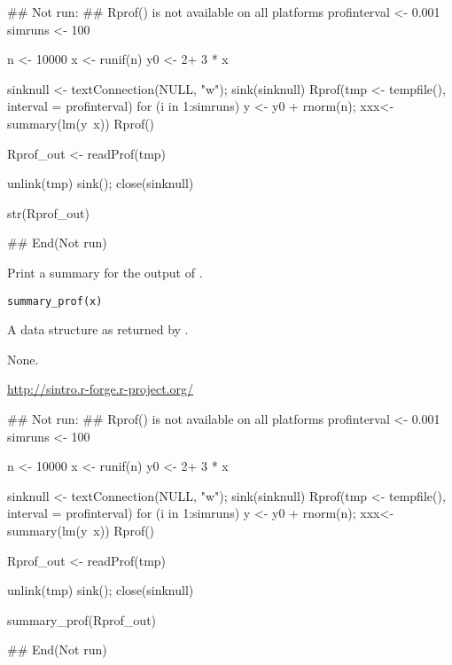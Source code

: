 \documentclass[a4paper]{book}
\begin{document}
%
\begin{Examples}
\begin{ExampleCode}
## Not run: 
## Rprof() is not available on all platforms
profinterval <- 0.001
simruns <- 100

n <- 10000
x <- runif(n)
y0 <- 2+ 3 * x

sinknull <- textConnection(NULL, "w"); sink(sinknull)
Rprof(tmp <- tempfile(), interval = profinterval)
for (i in 1:simruns) {y <- y0 +  rnorm(n); xxx<- summary(lm(y~x))}
Rprof()

Rprof_out <- readProf(tmp)

unlink(tmp)
sink(); close(sinknull)

str(Rprof_out)

## End(Not run)
\end{ExampleCode}
\end{Examples}
%
\begin{Description}\relax
Print a summary for the output of .
\end{Description}
%
\begin{Usage}
\begin{verbatim}
summary_prof(x)
\end{verbatim}
\end{Usage}
%
\begin{Arguments}
\begin{ldescription}
\item[\code{x}] A data structure as returned by  .

\end{ldescription}
\end{Arguments}
%
\begin{Value}
None.
\end{Value}
%
\begin{References}\relax
  \url{http://sintro.r-forge.r-project.org/} 
\end{References}
%
\begin{SeeAlso}\relax
{}
\end{SeeAlso}
%
\begin{Examples}
\begin{ExampleCode}
	## Not run: 
## Rprof() is not available on all platforms
profinterval <- 0.001
simruns <- 100

n <- 10000
x <- runif(n)
y0 <- 2+ 3 * x

sinknull <- textConnection(NULL, "w"); sink(sinknull)
Rprof(tmp <- tempfile(), interval = profinterval)
for (i in 1:simruns) {y <- y0 +  rnorm(n); xxx<- summary(lm(y~x))}
Rprof()

Rprof_out <- readProf(tmp)

unlink(tmp)
sink(); close(sinknull)

summary_prof(Rprof_out)

## End(Not run)

\end{ExampleCode}
\end{Examples}
\printindex{}
\end{document}
